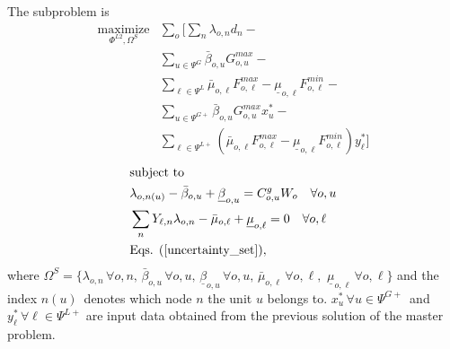 The subproblem is
\begin{align}
\label{sub_obj} \underset{\Phi^{L2}, \Omega^{S}}{\text{maximize}} &\sum\limits_o \Bigg[ \sum\limits_n \lambda_{o, n} d_n - \nonumber \\
&\sum\limits_{u \in \Psi^G} \bar{\beta}_{o,u} G_{o,u}^{max} - \nonumber \\
&\sum\limits_{\ell \in \Psi^L} \bar{\mu}_{o,\ell} F_{o,\ell}^{max} - \underline{\mu}_{o,\ell} F_{o,\ell}^{min} - \nonumber \\
&\sum\limits_{u \in \Psi^{G+}} \bar{\beta}_{o,u} G_{o,u}^{max} x_u^* - \nonumber \\
&\sum\limits_{\ell \in \Psi^{L+}} \left( \bar{\mu}_{o,\ell} F_{o,\ell}^{max} - \underline{\mu}_{o,\ell} F_{o,\ell}^{min} \right) y_\ell^* \Bigg]
\end{align}
\begin{align}
&\text{subject to} \nonumber \\
&\lambda_{o, n(u)} - \bar{\beta}_{o,u} + \underline{\beta}_{o,u} = C^g_{o,u}  W_o \quad \forall o, u \\
&\sum\limits_n Y_{\ell, n} \lambda_{o, n} - \bar{\mu}_{o, \ell} + \underline{\mu}_{o, \ell} = 0 \quad \forall o, \ell \\
&\text{Eqs. } (\ref{uncertainty_set}),
\end{align}
where $\Omega^{S} = \{ \lambda_{o, n} \, \forall o, n, \, \bar{\beta}_{o,u} \, \forall o, u, \, \underline{\beta}_{o,u} \, \forall o, u, \, \bar{\mu}_{o,\ell} \, \forall o, \ell,$ $\underline{\mu}_{o,\ell} \, \forall o, \ell \}$ and the index $n(u)$ denotes which node $n$ the unit $u$ belongs to. $x_u^* \, \forall u \in \Psi^{G+}$ and $y_\ell^* \, \forall \ell \in \Psi^{L+}$ are input data obtained from the previous solution of the master problem.

